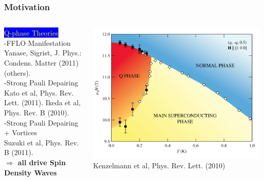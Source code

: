 \documentclass{beamer}
\newcommand\Fontvii{\fontsize{4}{4}\selectfont}
\begin{document}
\begin{frame} \frametitle{Motivation}

\begin{columns}
    \begin{column}{0.5\textwidth}
      \colorbox{blue}{\textcolor{yellow}{Q-phase Theories}} \\
      -FFLO Manifestation \\{\Fontvii Yanase, Sigrist, J. Phys.: Condens. Matter (2011)(others).} \\
      -Strong Pauli Depairing \\ {\Fontvii  Kato et al, Phys. Rev. Lett. (2011). Ikeda et al, Phys. Rev. B (2010). }\\
      -Strong Pauli Depairing + Vortices \\ {\Fontvii Suzuki et al, Phys. Rev. B (2011). }\\ \vspace{0.5cm}
   {\bf $\Rightarrow$ all drive Spin Density Waves} \\ \vspace{0.5cm}
    \end{column}
    \begin{column}{0.5\textwidth}
\includegraphics[height=0.87\textwidth, width=\textwidth]{PhaseDiagramS.jpg}\Fontvii \\ Kenzelmann et al, Phys. Rev. Lett. (2010)
    \end{column}
  \end{columns}
  

\end{frame}
\end{document}
